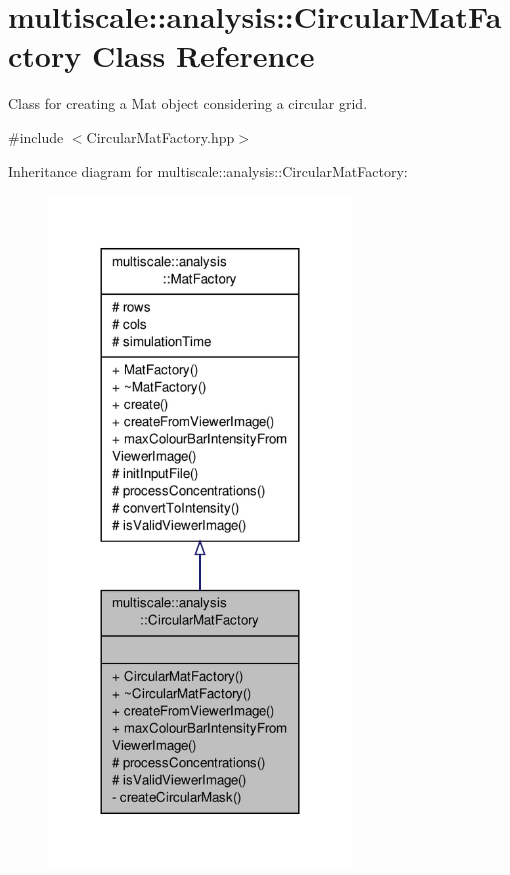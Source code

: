 \hypertarget{classmultiscale_1_1analysis_1_1CircularMatFactory}{\section{multiscale\-:\-:analysis\-:\-:Circular\-Mat\-Factory Class Reference}
\label{classmultiscale_1_1analysis_1_1CircularMatFactory}
}


Class for creating a Mat object considering a circular grid.  




{\ttfamily \#include $<$Circular\-Mat\-Factory.\-hpp$>$}



Inheritance diagram for multiscale\-:\-:analysis\-:\-:Circular\-Mat\-Factory\-:\nopagebreak
\begin{figure}[H]
\begin{center}
\leavevmode
\includegraphics[width=228pt]{classmultiscale_1_1analysis_1_1CircularMatFactory__inherit__graph}
\end{center}
\end{figure}


